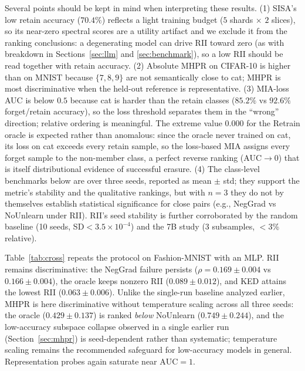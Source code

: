\documentclass[smallextended]{svjour3}       %
\begin{document}
Several points should be kept in mind when interpreting these results. (1) SISA's low retain accuracy ($70.4\%$) reflects a light training budget ($5$ shards $\times$ $2$ slices), so its near-zero spectral scores are a utility artifact and we exclude it from the ranking conclusions: a degenerating model can drive RII toward zero (as with breakdown in Sections~\ref{sec:llm} and \ref{sec:benchmark}), so a low RII should be read together with retain accuracy. (2) Absolute MHPR on CIFAR-10 is higher than on MNIST because $\{7,8,9\}$ are not semantically close to cat; MHPR is most discriminative when the held-out reference is representative. (3) MIA-loss AUC is below $0.5$ because cat is harder than the retain classes ($85.2\%$ vs $92.6\%$ forget/retain accuracy), so the loss threshold separates them in the ``wrong'' direction; relative ordering is meaningful. The extreme value $0.000$ for the Retrain oracle is expected rather than anomalous: since the oracle never trained on cat, its loss on cat exceeds every retain sample, so the loss-based MIA assigns every forget sample to the non-member class, a perfect reverse ranking (AUC${\to}0$) that is itself distributional evidence of successful erasure. (4) The class-level benchmarks below are over three seeds, reported as mean $\pm$ std; they support the metric's stability and the qualitative rankings, but with $n{=}3$ they do not by themselves establish statistical significance for close pairs (e.g., NegGrad vs NoUnlearn under RII). RII's seed stability is further corroborated by the random baseline (10 seeds, SD$<3.5{\times}10^{-4}$) and the 7B study (3 subsamples, $<$3\% relative).

Table~\ref{tab:cross} repeats the protocol on Fashion-MNIST with an MLP. RII remains discriminative: the NegGrad failure persists ($\rho{=}0.169{\pm}0.004$ vs $0.166{\pm}0.004$), the oracle keeps nonzero RII ($0.089{\pm}0.012$), and KED attains the lowest RII ($0.063{\pm}0.006$). Unlike the single-run baseline analyzed earlier, MHPR is here discriminative without temperature scaling across all three seeds: the oracle ($0.429{\pm}0.137$) is ranked \emph{below} NoUnlearn ($0.749{\pm}0.244$), and the low-accuracy subspace collapse observed in a single earlier run (Section~\ref{sec:mhpr}) is seed-dependent rather than systematic; temperature scaling remains the recommended safeguard for low-accuracy models in general. Representation probes again saturate near $\mathrm{AUC}{=}1$.
\end{document}
